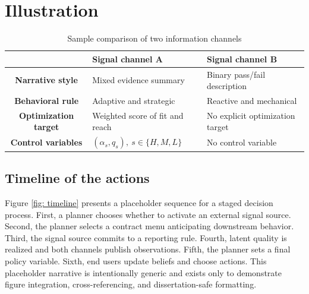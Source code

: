 \section{Illustration}

\begin{table}[htbp]
\centering
\small
\renewcommand{\arraystretch}{1.2}
\begin{tabularx}{\textwidth}{|c|Y|Y|}
\hline
& \textbf{Signal channel A} & \textbf{Signal channel B} \\
\hline
\textbf{Narrative style} & Mixed evidence summary & Binary pass/fail description \\
\hline
\textbf{Behavioral rule} & Adaptive and strategic & Reactive and mechanical \\
\hline
\textbf{Optimization target} & Weighted score of fit and reach & No explicit optimization target \\
\hline
\textbf{Control variables} & $(\alpha_s, q_s),\ s\in\{H,M,L\}$ & No control variable \\
\hline
\end{tabularx}
\caption{Sample comparison of two information channels}
\label{tab:organic_influencer_influencer_lead_user}
\end{table}

\subsection{Timeline of the actions}\label{sec: timeline}
Figure \ref{fig: timeline} presents a placeholder sequence for a staged decision process. First, a planner chooses whether to activate an external signal source. Second, the planner selects a contract menu anticipating downstream behavior. Third, the signal source commits to a reporting rule. Fourth, latent quality is realized and both channels publish observations. Fifth, the planner sets a final policy variable. Sixth, end users update beliefs and choose actions. This placeholder narrative is intentionally generic and exists only to demonstrate figure integration, cross-referencing, and dissertation-safe formatting.

